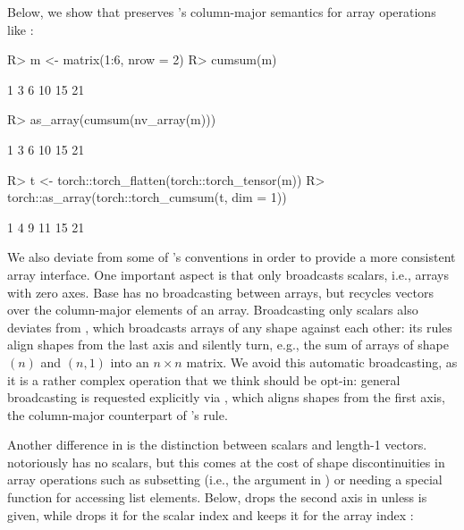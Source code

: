 \documentclass[article,shortnames]{jss}
\renewenvironment{CodeChunk}{\par\addvspace{0.6\baselineskip}\noindent\begin{minipage}{\linewidth}}{\end{minipage}\par\vspace{0.6\baselineskip}}
\begin{document}
Below, we show that  preserves 's column-major semantics for array operations like :

\begin{CodeChunk}
\begin{CodeInput}
R> m <- matrix(1:6, nrow = 2)
R> cumsum(m)
\end{CodeInput}
\begin{CodeOutput}
[1]  1  3  6 10 15 21
\end{CodeOutput}
\begin{CodeInput}
R> as_array(cumsum(nv_array(m)))
\end{CodeInput}
\begin{CodeOutput}
[1]  1  3  6 10 15 21
\end{CodeOutput}
\begin{CodeInput}
R> t <- torch::torch_flatten(torch::torch_tensor(m))
R> torch::as_array(torch::torch_cumsum(t, dim = 1))
\end{CodeInput}
\begin{CodeOutput}
[1]  1  4  9 11 15 21
\end{CodeOutput}
\end{CodeChunk}

We also deviate from some of 's conventions in order to provide a more consistent array interface.
One important aspect is that  only broadcasts scalars, i.e., arrays with zero axes.
Base  has no broadcasting between arrays, but recycles vectors over the column-major elements of an array.
Broadcasting only scalars also deviates from , which broadcasts arrays of any shape against each other: its rules align shapes from the last axis and silently turn, e.g., the sum of arrays of shape $(n)$ and $(n, 1)$ into an $n \times n$ matrix.
We avoid this automatic broadcasting, as it is a rather complex operation that we think should be opt-in: general broadcasting is requested explicitly via , which aligns shapes from the first axis, the column-major counterpart of 's rule.

Another difference in  is the distinction between scalars and length-1 vectors.
 notoriously has no scalars, but this comes at the cost of shape discontinuities in array operations such as subsetting (i.e., the  argument in \code{[}) or needing a special function \code{[[} for accessing list elements.
Below,  drops the second axis in  unless  is given, while  drops it for the scalar index  and keeps it for the array index :
\end{document}
